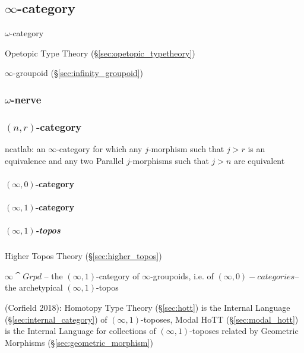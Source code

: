 \subsection{$\infty$-category}\label{sec:infinity_category}

$\omega$-category

Opetopic Type Theory (\S\ref{sec:opetopic_typetheory})

\fist $\infty$-groupoid (\S\ref{sec:infinity_groupoid})



\subsubsection{$\omega$-nerve}\label{sec:omega_nerve}

\subsubsection{$(n,r)$-category}\label{sec:nr_category}

ncatlab: an $\infty$-category for which any $j$-morphism such that $j>r$ is
an equivalence and any two Parallel $j$-morphisms such that $j>n$ are equivalent

\paragraph{$(\infty,0)$-category}\label{sec:infinity_0_category}\hfill

\paragraph{$(\infty,1)$-category}\label{sec:infinity_1_category}\hfill

\subparagraph{$(\infty,1)$-topos}\label{sec:infinity_1_topos}\hfill

\fist Higher Topos Theory (\S\ref{sec:higher_topos})

$\infty\cat{Grpd}$ -- the $(\infty,1)$-category of $\infty$-groupoids, i.e. of
$(\infty,0)-categories$-- the archetypical $(\infty,1)$-topos

(Corfield 2018): Homotopy Type Theory (\S\ref{sec:hott}) is the Internal
Language (\S\ref{sec:internal_category}) of $(\infty,1)$-toposes, Modal HoTT
(\S\ref{sec:modal_hott}) is the Internal Language for collections of
$(\infty,1)$-toposes related by Geometric Morphisms
(\S\ref{sec:geometric_morphism})



